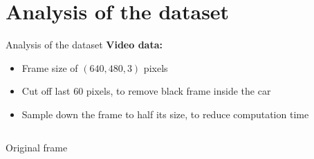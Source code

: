 \section{Analysis of the dataset}

\begin{frame}{Analysis of the dataset}
	\textbf{Video data:}
	\begin{itemize}
		\item<+-> Frame size of $(640,480,3)$ pixels
		\item<+-> Cut off last 60 pixels, to remove black frame inside the car
		\item<+-> Sample down the frame to half its size, to reduce computation time
	\end{itemize}
	
	\begin{columns}[t]
		\begin{column}{.45\textwidth}
			\begin{center}
				\small{Original frame}
			\end{center}
		\end{column}
		\begin{column}{.45\textwidth}
			\begin{center}

\end{center}
\end{column}
\end{columns}
\end{frame}
